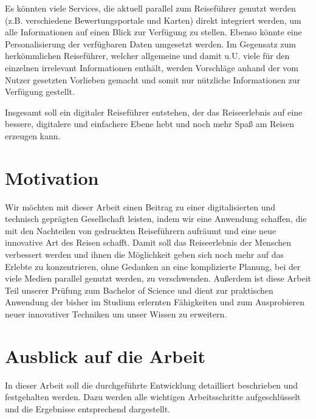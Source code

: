 	Es könnten viele Services, die aktuell parallel zum Reiseführer genutzt werden (z.B. verschiedene Bewertungsportale und Karten) direkt integriert werden, um alle Informationen auf einen Blick zur Verfügung zu stellen. Ebenso könnte eine Personalisierung der verfügbaren Daten umgesetzt werden. Im Gegensatz zum herkömmlichen Reiseführer, welcher allgemeine und damit u.U. viele für den einzelnen irrelevant Informationen enthält, werden Vorschläge anhand der vom Nutzer gesetzten Vorlieben gemacht und somit nur nützliche Informationen zur Verfügung gestellt.

	\vspace{0.25cm}

	Insgesamt soll ein digitaler Reiseführer entstehen, der das Reiseerlebnis auf eine bessere, digitalere und einfachere Ebene hebt und noch mehr Spaß am Reisen erzeugen kann.

	\section{Motivation}

	Wir möchten mit dieser Arbeit einen Beitrag zu einer digitalisierten und technisch geprägten Gesellschaft leisten, indem wir eine Anwendung schaffen, die mit den Nachteilen von gedruckten Reiseführern aufräumt und eine neue innovative Art des Reisen schafft. Damit soll das Reiseerlebnis der Menschen verbessert werden und ihnen die Möglichkeit geben sich noch mehr auf das Erlebte zu konzentrieren, ohne Gedanken an eine komplizierte Planung, bei der viele Medien parallel genutzt werden, zu verschwenden.
	Außerdem ist diese Arbeit Teil unserer Prüfung zum Bachelor of Science und dient zur praktischen Anwendung der bisher im Studium erlernten Fähigkeiten und zum Ausprobieren neuer innovativer Techniken um unser Wissen zu erweitern.   

	\section{Ausblick auf die Arbeit}
	
	In dieser Arbeit soll die durchgeführte Entwicklung detailliert beschrieben und festgehalten werden. Dazu werden alle wichtigen Arbeitsschritte aufgeschlüsselt und die Ergebnisse entsprechend dargestellt. 
	
	\vspace{0.25cm}
	
